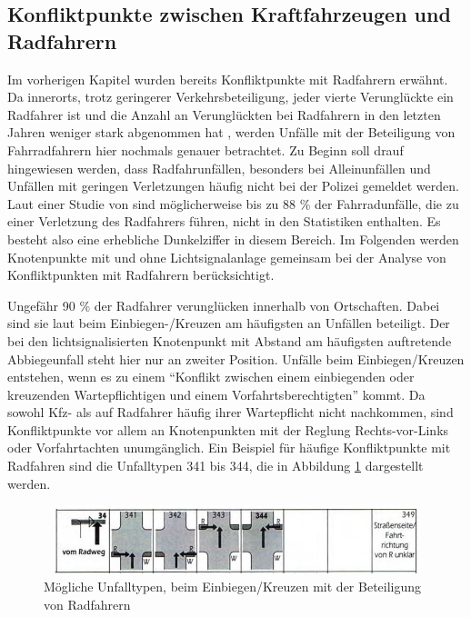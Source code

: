 \subsection{Konfliktpunkte zwischen Kraftfahrzeugen und Radfahrern}\label{subsection:Konfliktpunkte zwischen Kraftfahrzeugen und Radfahrern}
Im vorherigen Kapitel wurden bereits Konfliktpunkte mit Radfahrern erwähnt. Da innerorts, trotz geringerer Verkehrsbeteiligung, jeder vierte Verunglückte ein Radfahrer ist \parencite[S. 303]{Schreiber.2014b} und die Anzahl an Verunglückten bei Radfahrern in den letzten Jahren weniger stark abgenommen hat \parencite[S. 7]{Below.2016}, werden Unfälle mit der Beteiligung von Fahrradfahrern hier nochmals genauer betrachtet. Zu Beginn soll drauf hingewiesen werden, dass Radfahrunfällen, besonders bei Alleinunfällen und Unfällen mit geringen Verletzungen häufig nicht bei der Polizei gemeldet werden. Laut einer Studie von \Textcite[S. 80]{Below.2016} sind möglicherweise bis zu 88 \% der Fahrradunfälle, die zu einer Verletzung des Radfahrers führen, nicht in den Statistiken enthalten. Es besteht also eine erhebliche Dunkelziffer in diesem Bereich. Im Folgenden werden Knotenpunkte mit und ohne Lichtsignalanlage gemeinsam bei der Analyse von Konfliktpunkten mit Radfahrern berücksichtigt.

Ungefähr 90 \% \parencite[S. 10]{Below.2016} der Radfahrer verunglücken innerhalb von Ortschaften. Dabei sind sie laut \Textcite[S. 303]{Schreiber.2014b} beim Einbiegen-/Kreuzen am häufigsten an Unfällen beteiligt. Der bei den lichtsignalisierten Knotenpunkt mit Abstand am häufigsten auftretende Abbiegeunfall steht hier nur an zweiter Position. Unfälle beim Einbiegen/Kreuzen entstehen, wenn es zu einem \enquote{Konflikt zwischen einem einbiegenden oder kreuzenden Wartepflichtigen und einem Vorfahrtsberechtigten} \parencite[S. 12]{GesamtverbandderDeutschenVersicherungswirtschafte.V..2016} kommt. Da sowohl \ac{Kfz}- als auf Radfahrer häufig ihrer Wartepflicht nicht nachkommen, sind Konfliktpunkte vor allem an Knotenpunkten mit der Reglung Rechts-vor-Links oder Vorfahrtachten unumgänglich. Ein Beispiel für häufige Konfliktpunkte mit Radfahren sind die Unfalltypen 341 bis 344, die in Abbildung \ref{fig:Einbiege-Unfall_Rad} dargestellt werden.

\begin{savenotes}
	\begin{figure}[H]
		\centering
		\includegraphics[width=13cm,height=2cm]{figures/Einbiege-Unfall_Rad}
		\caption[Unfalltyp 3 Einbiegen/Kreuzen-Unfall mit Radfahrerbeteiligung]{Mögliche Unfalltypen, beim Einbiegen/Kreuzen mit der Beteiligung von Radfahrern \parencite[S. 13]{GesamtverbandderDeutschenVersicherungswirtschafte.V..2016}}\label{fig:Einbiege-Unfall_Rad}
	\end{figure}
\end{savenotes}

